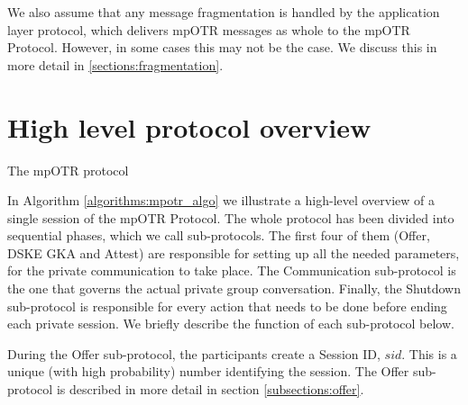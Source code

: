We also assume that any message fragmentation is handled by the application layer protocol, which delivers mpOTR messages as whole to the mpOTR Protocol. However, in some cases this may not be the case. We discuss this in more detail in \ref{sections:fragmentation}.

\section{High level protocol overview}
\begin{algorithm}[H]
  \label{algorithms:mpotr_algo}
  \caption{The mpOTR protocol}
\end{algorithm}

In Algorithm \ref{algorithms:mpotr_algo} we illustrate a high-level overview of a single session of the mpOTR Protocol. The whole protocol has been divided into sequential phases, which we call sub-protocols. The first four of them (Offer, DSKE GKA and Attest) are responsible for setting up all the needed parameters, for the private communication to take place. The Communication sub-protocol is the one that governs the actual private group conversation. Finally, the Shutdown sub-protocol is responsible for every action that needs to be done before ending each private session. We briefly describe the function of each sub-protocol below.

During the Offer sub-protocol, the participants create a Session ID, $sid$. This is a unique (with high probability) number identifying the session. The Offer sub-protocol is described in more detail in section \ref{subsections:offer}. 

